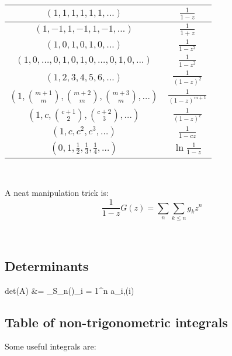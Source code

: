   \begin{tabular}{|c|c|}
    \hline
    $(1,1,1,1,1,1,\ldots)$ & $\frac{1}{1-z}$ \\ \hline
    $(1,-1,1,-1,1,-1,\ldots)$ & $\frac{1}{1+z}$ \\ \hline
    $(1,0,1,0,1,0,\ldots)$ & $\frac{1}{1-z^2}$ \\ \hline
    $(1,0,\ldots,0,1,0,1,0,\ldots,0,1,0,\ldots)$ & $\frac{1}{1-z^2}$ \\ \hline
    $(1,2,3,4,5,6,\ldots)$ & $\frac{1}{(1-z)^2}$ \\ \hline
    $(1,\binom{m+1}{m},\binom{m+2}{m},\binom{m+3}{m},\ldots)$ & $\frac{1}{(1-z)^{m+1}}$ \\ \hline
    $(1,c,\binom{c+1}{2},\binom{c+2}{3},\ldots)$ & $\frac{1}{(1-z)^c}$ \\ \hline
    $(1,c,c^2, c^3, \ldots)$ & $\frac{1}{1-cz}$ \\ \hline
    $(0,1,\frac{1}{2},\frac{1}{3},\frac{1}{4},\ldots)$ & $\ln \frac{1}{1-z}$ \\ \hline
  \end{tabular}

\


A neat manipulation trick is:
\begin{equation*}
  \frac{1}{1-z}G(z) = \sum_{n}\sum_{k\leq n}g_kz^n
\end{equation*}

\

\subsection{Determinants}
              det(A) &= \sum_{\sigma \in S_n}(\sigma)\prod_{i = 1}^n a_{i,\sigma(i)}

\subsection{Table of non-trigonometric integrals}
      Some useful integrals are:
      
